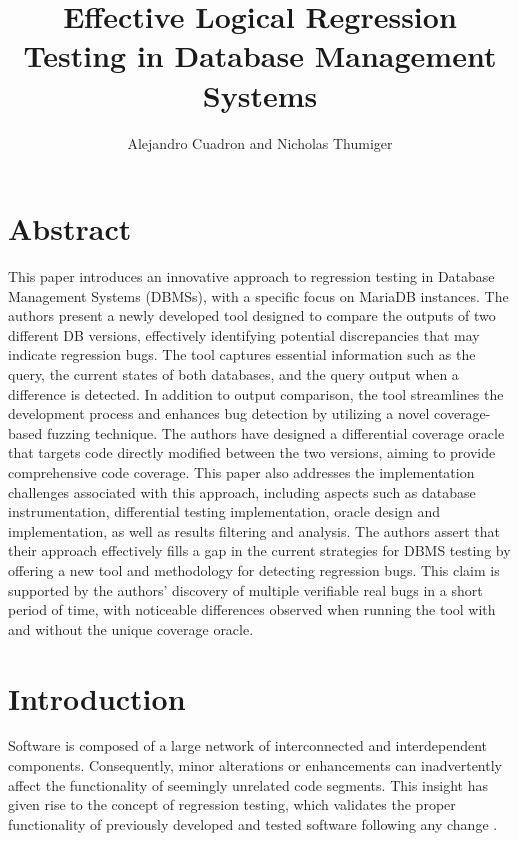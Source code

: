 \documentclass[sigconf]{acmart}
\author[]{}
\begin{document}
\title{Effective Logical Regression Testing in Database Management Systems}
\author{Alejandro Cuadron and Nicholas Thumiger}

\maketitle

\section{Abstract}
This paper introduces an innovative approach to regression testing in Database Management Systems (DBMSs), with a specific focus on MariaDB instances. The authors present a newly developed tool designed to compare the outputs of two different DB versions, effectively identifying potential discrepancies that may indicate regression bugs. The tool captures essential information such as the query, the current states of both databases, and the query output when a difference is detected. In addition to output comparison, the tool streamlines the development process and enhances bug detection by utilizing a novel coverage-based fuzzing technique. The authors have designed a differential coverage oracle that targets code directly modified between the two versions, aiming to provide comprehensive code coverage. This paper also addresses the implementation challenges associated with this approach, including aspects such as database instrumentation, differential testing implementation, oracle design and implementation, as well as results filtering and analysis. The authors assert that their approach effectively fills a gap in the current strategies for DBMS testing by offering a new tool and methodology for detecting regression bugs. This claim is supported by the authors' discovery of multiple verifiable real bugs in a short period of time, with noticeable differences observed when running the tool with and without the unique coverage oracle.


\section{Introduction}
Software is composed of a large network of interconnected and interdependent components. Consequently, minor alterations or enhancements can inadvertently affect the functionality of seemingly unrelated code segments. This insight has given rise to the concept of regression testing, which validates the proper functionality of previously developed and tested software following any change \cite{software_testing}.
\end{document}
